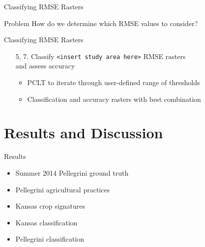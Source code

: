 \documentclass[  compress,xcolor={usenames,dvipsnames}]{beamer}
\begin{document}
\begin{frame}{Classifying RMSE Rasters}
\begin{alertblock}{Problem}
  How do we determine which RMSE values to consider?
\end{alertblock}
\end{frame}

\begin{frame}{Classifying RMSE Rasters}
\begin{enumerate}
  \item[5, 7.] Classify {\footnotesize\texttt{<insert study area here>}} RMSE rasters\\and assess accuracy
  \begin{itemize}
    \item<2-> PCLT to iterate through user-defined range of thresholds
    \item<3-> Classification and accuracy rasters with best combination
  \end{itemize}
\end{enumerate}
\end{frame}


\section{Results and Discussion}
\begin{frame}{Results}
\begin{itemize}
  \item Summer 2014 Pellegrini ground truth
  \item Pellegrini agricultural practices
  \item Kansas crop signatures
  \item Kansas classification
  \item Pellegrini classification
\end{itemize}
\end{frame}
\end{document}

